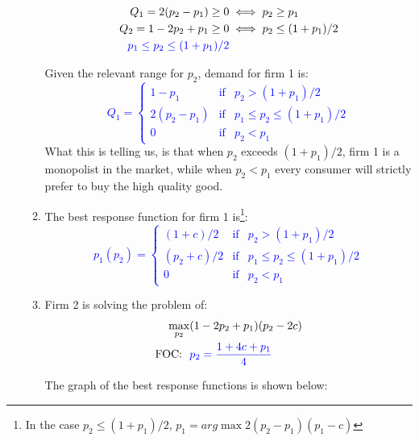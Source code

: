 \documentclass[12pt,english]{article}
\begin{document}
\begin{enumerate}
\begin{enumerate}
\begin{align}
Q_{1}=2(p_{2}-p_{1})\geq0&\iff p_{2}\geq p_{1}\nonumber\\
Q_{2}=1-2p_{2}+p_{1}\geq0&\iff p_{2}\leq (1+p_{1})/2\nonumber\\
\textcolor{blue}{p_{1}\leq p_{2}\leq(1+p_{1})/2}\nonumber
\end{align}

Given the relevant range for $p_{2}$, demand for firm 1 is:
\textcolor{blue}{
\[
Q_{1}=
\left\{\begin{array}{ccc}
1-p_{1}&\mbox{if}&p_{2}>(1+p_{1})/2\\
2(p_{2}-p_{1})&\mbox{if}&p_{1}\leq p_{2}\leq(1+p_{1})/2\\
0&\mbox{if}& p_{2}< p_{1}
\end{array}\right.
\]
}
What this is telling us, is that when $p_{2}$ exceeds $(1+p_{1})/2$, firm 1 is a monopolist in the market, while when $p_{2}< p_{1}$ every consumer will strictly prefer to buy the high quality good.

\item The best response function for firm 1 is\footnote{In the case $p_{2}\leq(1+p_{1})/2$, $p_{1}=arg\max 2(p_{2}-p_{1})(p_{1}-c)$}:
\textcolor{blue}{
\[
p_{1}(p_{2})=
\left\{\begin{array}{ccc}
(1+c)/2&\mbox{if}&p_{2}>(1+p_{1})/2\\
(p_{2}+c)/2&\mbox{if}&p_{1}\leq p_{2}\leq(1+p_{1})/2\\
0&\mbox{if}& p_{2}< p_{1}
\end{array}\right.
\]
}
\item Firm 2 is solving the problem of:
\begin{align}
\max_{p_{2}}& (1-2p_{2}+p_{1})(p_{2}-2c)\nonumber\\
\mbox{FOC:}\ \ & \textcolor{blue}{p_{2}=\frac{1+4c+p_{1}}{4}}\nonumber
\end{align}

 The graph of the best response functions is shown below:


\end{enumerate}
\end{enumerate}
\end{document}
